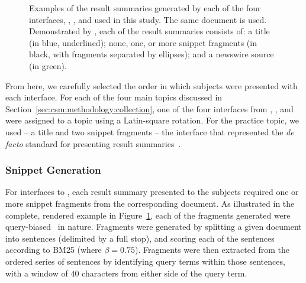 \begin{figure}[t!]
    \centering
    \caption[Examples of result summaries from the four interfaces]{Examples of the result summaries generated by each of the four interfaces, , ,  and  used in this study. The same document is used. Demonstrated by \searchlogo, each of the result summaries consists of: a title (in blue, underlined); none, one, or more snippet fragments (in black, with fragments separated by ellipses); and a newswire source (in green).}
    \label{fig:interface_snippets}
\end{figure}

From here, we carefully selected the order in which subjects were presented with each interface. For each of the four main topics discussed in Section~\ref{sec:csm:methodology:collection}, one of the four interfaces from , ,  and  were assigned to a topic using a Latin-square rotation. For the practice topic, we used  -- a title and two snippet fragments -- the interface that represented the \emph{de facto} standard for presenting result summaries~\citep{hearst2009_search}.

\subsubsection{Snippet Generation}
For interfaces  to , each result summary presented to the subjects required one or more snippet fragments from the corresponding document. As illustrated in the complete, rendered example in Figure~\ref{fig:interface_snippets}, each of the fragments generated were query-biased~\citep{tombros1998query_biased} in nature. Fragments were generated by splitting a given document into sentences (delimited by a full stop), and scoring each of the sentences according to BM25 (where $\beta=0.75$). Fragments were then extracted from the ordered series of sentences by identifying query terms within those sentences, with a window of $40$ characters from either side of the query term.

